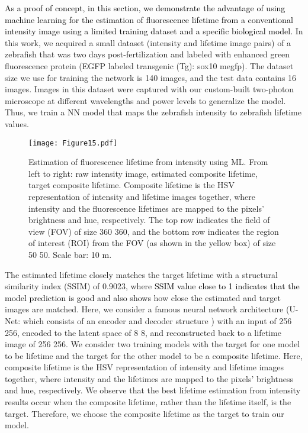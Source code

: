 \documentclass[12pt]{iopart}
\newcommand{\cc}[1]{\textcolor{black}{#1}}
\begin{document}
\cc{As a proof of concept, in this section, we demonstrate the advantage of using machine learning for the estimation of fluorescence lifetime from a conventional intensity image using a limited training dataset and a specific biological model.}
In this work, we acquired a small dataset (intensity and lifetime image pairs) of a zebrafish that was two days post-fertilization and labeled with enhanced green fluorescence protein (EGFP labeled transgenic (Tg): sox10 megfp). The dataset size we use for training the network is 140 images, and the test data contains 16 images. Images in this  dataset were captured with our custom-built two-photon microscope \cite{instant_flim} at different wavelengths and power levels to generalize the model. Thus, we train a NN model that maps the zebrafish intensity to zebrafish lifetime values.

\begin{figure}[!t]
\centering
\texttt{[image: Figure15.pdf]}
\caption{Estimation of fluorescence lifetime from intensity using ML. From left to right: raw intensity image, estimated composite lifetime, target composite lifetime. Composite lifetime is the HSV representation of intensity and lifetime images together, where intensity and the fluorescence lifetimes are mapped to the pixels’ brightness and hue, respectively. The top row indicates the field of view (FOV) of size 360  360, and the bottom row indicates the region of interest (ROI) from the FOV (as shown in the yellow box) of size 50  50. Scale bar: 10 m.}\label{Fig2_PD}
\end{figure}

The estimated lifetime closely matches the target lifetime with a structural similarity index (SSIM) \cite{wang2004image_SSIM} of 0.9023, where \cc{SSIM value close to 1 indicates that the model prediction is good and also shows} how close the estimated and target images are matched. Here, we consider a famous neural network architecture (U-Net: which consists of an encoder and decoder structure \cite{mannam2020performance}) with an input of 256  256, encoded to the latent space of 8  8, and reconstructed back to a lifetime image of 256  256. We consider two training models with the target for one model to be lifetime and the target for the other model to be a composite lifetime. Here, composite lifetime is the HSV representation of intensity and lifetime images together, where intensity and the lifetimes are mapped to the pixels’ brightness and hue, respectively. We observe that the best lifetime estimation from intensity results occur when the composite lifetime, rather than the lifetime itself, is the target. Therefore, we choose the composite lifetime as the target to train our model. 
\end{document}
